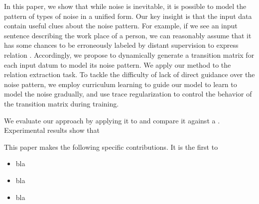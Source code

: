 In this paper, we show that while noise is inevitable, it is possible to model the pattern of   types of noise in a unified form.  Our key insight is that the input data contain useful clues about the noise pattern. For example, if we see an input sentence describing the work place of a person, we can reasonably assume that it has some chances to be erroneously labeled by distant supervision to express relation  .
Accordingly, we propose to dynamically generate a transition matrix for each input datum to model its noise pattern. We apply our method to the relation extraction task. To tackle the difficulty of lack of direct guidance over the noise pattern, we employ curriculum learning to guide our model to learn to model the noise gradually, and use trace regularization to control the behavior of the transition matrix during training. %

We evaluate our approach by applying it to  and compare it against a
. Experimental results show that 

This paper makes the following specific contributions. It is the first to
\begin{itemize}
\item bla 
\item bla
\item bla
\end{itemize}

